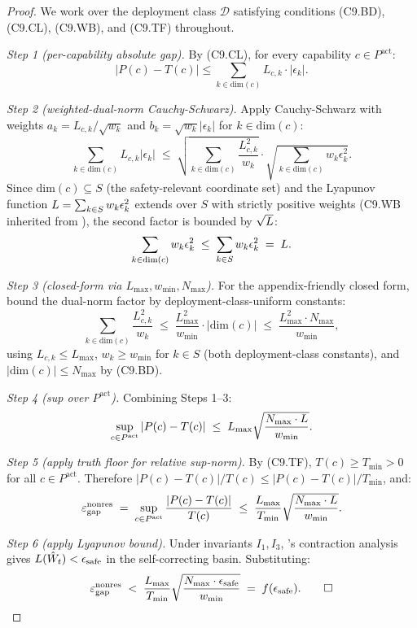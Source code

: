 \begin{proof}
We work over the deployment class $\mathcal{D}$ satisfying
conditions (C9.BD), (C9.CL), (C9.WB), and (C9.TF) throughout.

\emph{Step 1 (per-capability absolute gap).}  By (C9.CL), for
every capability $c \in P^{\mathrm{act}}$:
\[
  |P(c) - T(c)| \leq \sum_{k \in \mathrm{dim}(c)} L_{c,k} \cdot
  |\epsilon_k|.
\]

\emph{Step 2 (weighted-dual-norm Cauchy-Schwarz).}  Apply
Cauchy-Schwarz with weights $a_k = L_{c,k}/\sqrt{w_k}$ and
$b_k = \sqrt{w_k} |\epsilon_k|$ for $k \in \mathrm{dim}(c)$:
\[
  \sum_{k \in \mathrm{dim}(c)} L_{c,k} |\epsilon_k|
  \;\leq\;
  \sqrt{\sum_{k \in \mathrm{dim}(c)} \frac{L_{c,k}^2}{w_k}}
  \cdot \sqrt{\sum_{k \in \mathrm{dim}(c)} w_k \epsilon_k^2}.
\]
Since $\mathrm{dim}(c) \subseteq S$ (the safety-relevant coordinate
set) and the Lyapunov function $L = \sum_{k \in S} w_k
\epsilon_k^2$ extends over $S$ with strictly positive weights
(C9.WB inherited from \citep[Phase~Redundancy]{lasser2026phase}),
the second factor is bounded by $\sqrt{L}$:
\[
  \sum_{k \in \mathrm{dim}(c)} w_k \epsilon_k^2
  \;\leq\; \sum_{k \in S} w_k \epsilon_k^2
  \;=\; L.
\]

\emph{Step 3 (closed-form via $L_{\max}, w_{\min}, N_{\max}$).}
For the appendix-friendly closed form, bound the dual-norm factor
by deployment-class-uniform constants:
\[
  \sum_{k \in \mathrm{dim}(c)} \frac{L_{c,k}^2}{w_k}
  \;\leq\; \frac{L_{\max}^2}{w_{\min}} \cdot |\mathrm{dim}(c)|
  \;\leq\; \frac{L_{\max}^2 \cdot N_{\max}}{w_{\min}},
\]
using $L_{c,k} \leq L_{\max}$, $w_k \geq w_{\min}$ for $k \in S$
(both deployment-class constants), and $|\mathrm{dim}(c)| \leq
N_{\max}$ by (C9.BD).

\emph{Step 4 (sup over $P^{\mathrm{act}}$).}  Combining Steps 1--3:
\[
  \sup_{c \in P^{\mathrm{act}}} |P(c) - T(c)|
  \;\leq\; L_{\max} \sqrt{\frac{N_{\max} \cdot L}{w_{\min}}}.
\]

\emph{Step 5 (apply truth floor for relative sup-norm).}  By
(C9.TF), $T(c) \geq T_{\min} > 0$ for all $c \in P^{\mathrm{act}}$.
Therefore $|P(c) - T(c)|/T(c) \leq |P(c) - T(c)|/T_{\min}$, and:
\[
  \varepsilon_{\mathrm{gap}}^{\mathrm{nonres}} \;=\; \sup_{c \in P^{\mathrm{act}}}
  \frac{|P(c) - T(c)|}{T(c)}
  \;\leq\; \frac{L_{\max}}{T_{\min}}
  \sqrt{\frac{N_{\max} \cdot L}{w_{\min}}}.
\]

\emph{Step 6 (apply Lyapunov bound).}  Under invariants $I_1, I_3$,
\citep[Phase~Redundancy]{lasser2026phase}'s contraction analysis
gives $L(\hat{W}_t) < \epsilon_{\mathrm{safe}}$ in the
self-correcting basin.  Substituting:
\[
  \varepsilon_{\mathrm{gap}}^{\mathrm{nonres}} \;<\; \frac{L_{\max}}{T_{\min}}
  \sqrt{\frac{N_{\max} \cdot \epsilon_{\mathrm{safe}}}{w_{\min}}}
  \;=\; f(\epsilon_{\mathrm{safe}}). \qquad\Box
\]
\end{proof}

